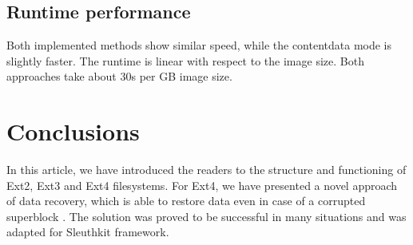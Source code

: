 \documentclass{acm_proc_article-sp}
\begin{document}
\subsection{Runtime performance}

Both implemented methods show similar speed, while the contentdata mode is slightly faster. The runtime is linear with respect to the image size. Both approaches take about 30s per GB image size.

\section{Conclusions}

In this article, we have introduced the readers to the structure and functioning of Ext2, Ext3 and Ext4 filesystems. For Ext4, we have presented a novel approach of data recovery, which is able to restore data even in case of a corrupted superblock \cite{afeic}. The solution was proved to be successful in many situations and was adapted for Sleuthkit framework.





\balancecolumns
\end{document}
